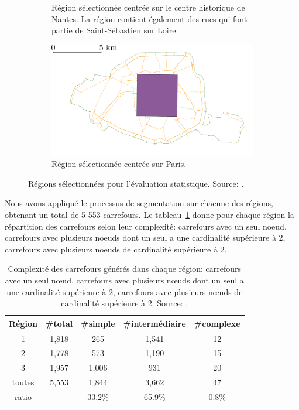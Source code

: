 \begin{figure}[ht]
\begin{subfigure}[t]{0.49\linewidth}
        \caption{Région sélectionnée centrée sur le centre historique de Nantes. La région contient également des rues qui font partie de Saint-Sébastien sur Loire.\label{fig:nantesRegion}}
    \end{subfigure}
    \begin{subfigure}[t]{0.49\linewidth}
        \includegraphics[width=\textwidth]{images/evaluation/crseg/paris.pdf}
        \caption{Région sélectionnée centrée sur Paris.\label{fig:parisRegion}}
    \end{subfigure}
    \caption[Régions sélectionnées pour l'évaluation statistique]{Régions sélectionnées pour l'évaluation statistique. Source: \citep{Favreau2022}.}
    \label{fig:regions}
\end{figure}

Nous avons appliqué le processus de segmentation sur chacune des régions, obtenant un total de 5 553 carrefours. Le tableau~\ref{tab:initRegions} donne pour chaque région la répartition des carrefours selon leur complexité: carrefours avec un seul noeud, carrefours avec plusieurs noeuds dont un seul a une cardinalité supérieure à 2, carrefours avec plusieurs noeuds de cardinalité supérieure à 2.

\newpar{}

\begin{table}[ht] 
    \centering
    \footnotesize
    \begin{tabular}{c|c|c|c|c}
    Région & \#total & \#simple &\#intermédiaire & \#complexe \\
    \hline
     1 & 1,818 & 265 & 1,541  & 12 \\
     2 & 1,778 & 573 & 1,190 & 15 \\
     3 & 1,957 & 1,006 & 931  & 20 \\
     \hline
     toutes & 5,553  & 1,844 & 3,662 &	47  \\
     \hline
     ratio & & 33.2\% & 65.9\% & 0.8\% \\
    \end{tabular}
    \caption[Complexité des carrefours générés dans chaque région]{Complexité des carrefours générés dans chaque région: carrefours avec un seul nœud, carrefours avec plusieurs nœuds dont un seul a une cardinalité supérieure à 2, carrefours avec plusieurs nœuds de cardinalité supérieure à 2. Source: \citep{Favreau2022}.}
    \label{tab:initRegions}
\end{table}

